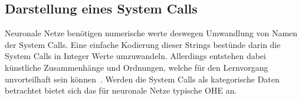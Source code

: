
        \subsection{Darstellung eines System Calls}\label{sec:syscalldarstellung}
            Neuronale Netze benötigen numerische werte deswegen Umwandlung von Namen der System Calls. 
            Eine einfache Kodierung dieser Strings bestünde darin die System Calls in Integer Werte umzuwandeln.
            Allerdings entstehen dabei künstliche Zusammenhänge und Ordnungen, welche für den Lernvorgang unvorteilhaft sein können~\cite{NEURALBISHOP1995}.
            Werden die System Calls als kategorische Daten betrachtet bietet sich das für neuronale Netze typische \ac{OHE} an.
